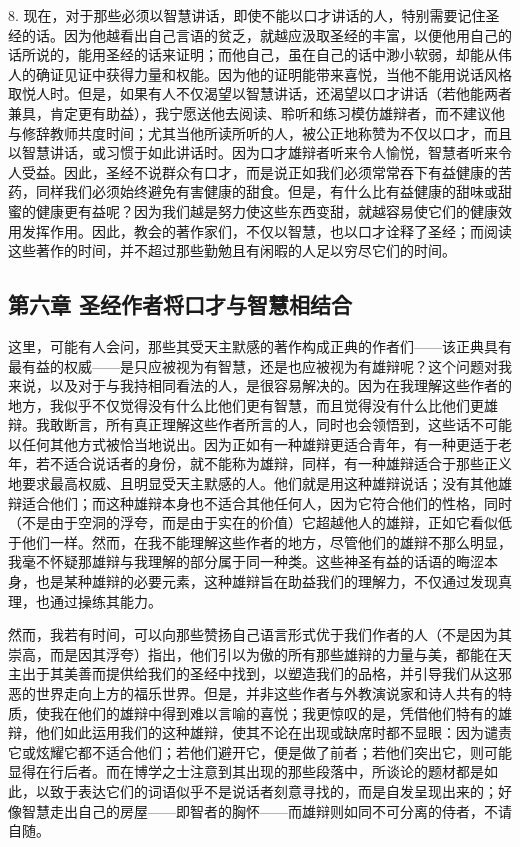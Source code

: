 8. 现在，对于那些必须以智慧讲话，即使不能以口才讲话的人，特别需要记住圣经的话。因为他越看出自己言语的贫乏，就越应汲取圣经的丰富，以便他用自己的话所说的，能用圣经的话来证明；而他自己，虽在自己的话中渺小软弱，却能从伟人的确证见证中获得力量和权能。因为他的证明能带来喜悦，当他不能用说话风格取悦人时。但是，如果有人不仅渴望以智慧讲话，还渴望以口才讲话（若他能两者兼具，肯定更有助益），我宁愿送他去阅读、聆听和练习模仿雄辩者，而不建议他与修辞教师共度时间；尤其当他所读所听的人，被公正地称赞为不仅以口才，而且以智慧讲话，或习惯于如此讲话时。因为口才雄辩者听来令人愉悦，智慧者听来令人受益。因此，圣经不说群众有口才，而是说正如我们必须常常吞下有益健康的苦药，同样我们必须始终避免有害健康的甜食。但是，有什么比有益健康的甜味或甜蜜的健康更有益呢？因为我们越是努力使这些东西变甜，就越容易使它们的健康效用发挥作用。因此，教会的著作家们，不仅以智慧，也以口才诠释了圣经；而阅读这些著作的时间，并不超过那些勤勉且有闲暇的人足以穷尽它们的时间。\par


\subsection{第六章 圣经作者将口才与智慧相结合}

这里，可能有人会问，那些其受天主默感的著作构成正典的作者们——该正典具有最有益的权威——是只应被视为有智慧，还是也应被视为有雄辩呢？这个问题对我来说，以及对于与我持相同看法的人，是很容易解决的。因为在我理解这些作者的地方，我似乎不仅觉得没有什么比他们更有智慧，而且觉得没有什么比他们更雄辩。我敢断言，所有真正理解这些作者所言的人，同时也会领悟到，这些话不可能以任何其他方式被恰当地说出。因为正如有一种雄辩更适合青年，有一种更适于老年，若不适合说话者的身份，就不能称为雄辩，同样，有一种雄辩适合于那些正义地要求最高权威、且明显受天主默感的人。他们就是用这种雄辩说话；没有其他雄辩适合他们；而这种雄辩本身也不适合其他任何人，因为它符合他们的性格，同时（不是由于空洞的浮夸，而是由于实在的价值）它超越他人的雄辩，正如它看似低于他们一样。然而，在我不能理解这些作者的地方，尽管他们的雄辩不那么明显，我毫不怀疑那雄辩与我理解的部分属于同一种类。这些神圣有益的话语的晦涩本身，也是某种雄辩的必要元素，这种雄辩旨在助益我们的理解力，不仅通过发现真理，也通过操练其能力。\par

然而，我若有时间，可以向那些赞扬自己语言形式优于我们作者的人（不是因为其崇高，而是因其浮夸）指出，他们引以为傲的所有那些雄辩的力量与美，都能在天主出于其美善而提供给我们的圣经中找到，以塑造我们的品格，并引导我们从这邪恶的世界走向上方的福乐世界。但是，并非这些作者与外教演说家和诗人共有的特质，使我在他们的雄辩中得到难以言喻的喜悦；我更惊叹的是，凭借他们特有的雄辩，他们如此运用我们的这种雄辩，使其不论在出现或缺席时都不显眼：因为谴责它或炫耀它都不适合他们；若他们避开它，便是做了前者；若他们突出它，则可能显得在行后者。而在博学之士注意到其出现的那些段落中，所谈论的题材都是如此，以致于表达它们的词语似乎不是说话者刻意寻找的，而是自发呈现出来的；好像智慧走出自己的房屋——即智者的胸怀——而雄辩则如同不可分离的侍者，不请自随。\par

